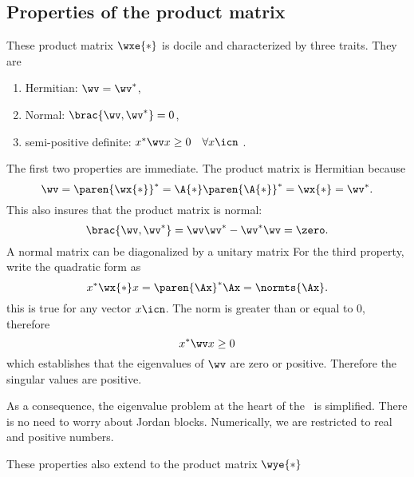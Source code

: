 \subsection{Properties of the product matrix}
These product matrix $\wxe{*}$ is docile and characterized by three traits. They are
\begin{enumerate}
\item Hermitian: \quad  $\wv = \wv^{*}$, 
\item Normal: \quad $\brac{\wv,\wv^{*}} = 0$, 
\item semi-positive definite: \quad $x^{*} \wv x \ge 0 \quad \forall x\icn$ .
\end{enumerate}
The first two properties are immediate. The product matrix is Hermitian because
\begin{equation}
  \wv = \paren{\wx{*}}^{*} = \A{*} \paren{\A{*}}^{*} = \wx{*} = \wv^{*}.
\end{equation}
This also insures that the product matrix is normal:
\begin{equation}
  \brac{\wv,\wv^{*}} = \wv \wv^{*} - \wv^{*} \wv = \zero.
\end{equation}
A normal matrix can be diagonalized by a unitary matrix
For the third property, write the quadratic form as
\begin{equation}
  x^{*} \wx{*} x = \paren{\Ax}^{*} \Ax = \normts{\Ax}.
\end{equation}
this is true for any vector $x\icn$. The norm is greater than or equal to 0, therefore 
\begin{equation}
  x^{*} \wv x \ge 0
\end{equation}
which establishes that the eigenvalues of $\wv$ are zero or positive. Therefore the singular values are positive.

As a consequence, the eigenvalue problem at the heart of the \asvd \ is simplified. There is no need to worry about Jordan blocks. Numerically, we are restricted to real and positive numbers. 

These properties also extend to the product matrix $\wye{*}$

\endinput